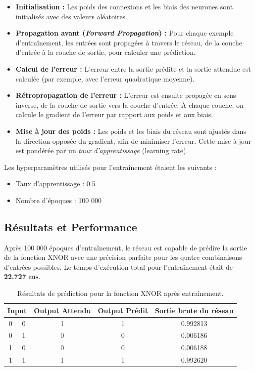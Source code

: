 \documentclass{article}
\begin{document}
\begin{itemize}
    \item \textbf{Initialisation :} Les poids des connexions et les biais des neurones sont initialisés avec des valeurs aléatoires.
    \item \textbf{Propagation avant (\textit{Forward Propagation}) :} Pour chaque exemple d'entraînement, les entrées sont propagées à travers le réseau, de la couche d'entrée à la couche de sortie, pour calculer une prédiction.
    \item \textbf{Calcul de l'erreur :} L'erreur entre la sortie prédite et la sortie attendue est calculée (par exemple, avec l'erreur quadratique moyenne).
    \item \textbf{Rétropropagation de l'erreur :} L'erreur est ensuite propagée en sens inverse, de la couche de sortie vers la couche d'entrée. À chaque couche, on calcule le gradient de l'erreur par rapport aux poids et aux biais.
    \item \textbf{Mise à jour des poids :} Les poids et les biais du réseau sont ajustés dans la direction opposée du gradient, afin de minimiser l'erreur. Cette mise à jour est pondérée par un \textit{taux d'apprentissage} (learning rate).
\end{itemize}

Les hyperparamètres utilisés pour l'entraînement étaient les suivants :
\begin{itemize}
    \item Taux d'apprentissage : 0.5
    \item Nombre d'époques : 100 000
\end{itemize}

\subsection{Résultats et Performance}

Après 100 000 époques d'entraînement, le réseau est capable de prédire la sortie de la fonction XNOR avec une précision parfaite pour les quatre combinaisons d'entrées possibles. Le temps d'exécution total pour l'entraînement était de \textbf{22.727 ms}.

\begin{table}[H]
    \centering
    \begin{tabular}{|c|c|c|c|c|}
        \hline
        \multicolumn{2}{|c|}{\textbf{Input}} & \textbf{Output Attendu} & \textbf{Output Prédit} & \textbf{Sortie brute du réseau} \\ \hline
        0 & 0 & 1 & 1 & 0.992813 \\ \hline
        0 & 1 & 0 & 0 & 0.006186 \\ \hline
        1 & 0 & 0 & 0 & 0.006188 \\ \hline
        1 & 1 & 1 & 1 & 0.992620 \\ \hline
    \end{tabular}
    \caption{Résultats de prédiction pour la fonction XNOR après entraînement.}
\end{table}
\end{document}
